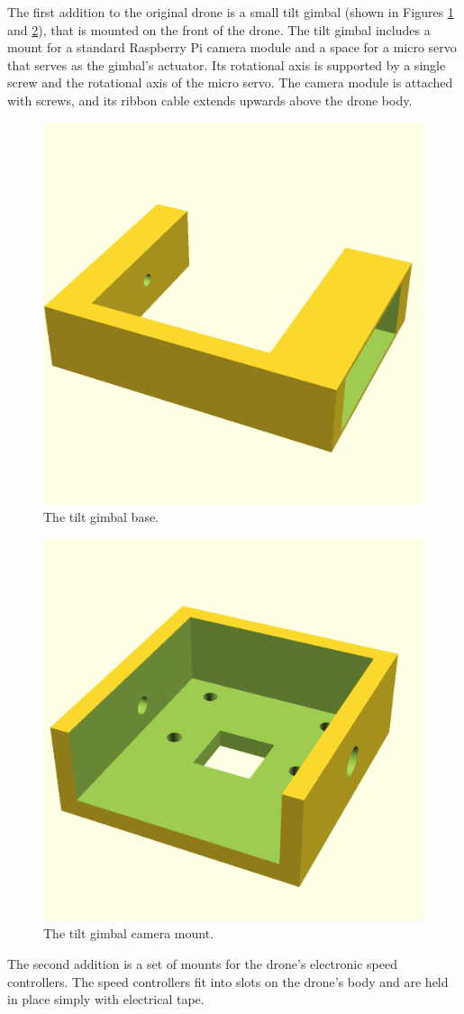 The first addition to the original drone is a small tilt gimbal
(shown in Figures \ref{figure:tilt_gimbal_base} and \ref{figure:tilt_gimbal_camera_mount}),
that is mounted on the front of the drone.
The tilt gimbal includes a mount for a standard Raspberry Pi camera module and a space for a micro servo that serves
as the gimbal's actuator.
Its rotational axis is supported by a single screw and the rotational axis of the micro servo.
The camera module is attached with screws, and its ribbon cable extends upwards above the drone body.

\begin{figure}
    \centering
    \includegraphics[width=0.75\columnwidth]{images/gimbal_base.png}
    \caption{The tilt gimbal base.}
    \label{figure:tilt_gimbal_base}
\end{figure}

\begin{figure}
    \centering
    \includegraphics[width=0.75\columnwidth]{images/gimbal_camera_mount.png}
    \caption{The tilt gimbal camera mount.}
    \label{figure:tilt_gimbal_camera_mount}
\end{figure}

The second addition is a set of mounts for the drone's electronic speed controllers.
The speed controllers fit into slots on the drone's body and are held in place simply with electrical tape.